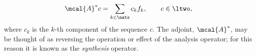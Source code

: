 \documentclass[a4paper, 12pt,preprint]{article}
\newcommand{\sumn}{\ensuremath{\sum_{k \in \nats}}\xspace}
\begin{document}
\begin{align}
  \mcal{A}^* c = \sum_{k \in \nats} c_k f_k, \qquad  c \in \ltwo,\notag
  \label{}
\end{align}
where $c_k$ is the $k$-th component of the sequence $c$. The adjoint, $\mcal{A}^*$, may be thought of as reversing the operation or effect of the analysis operator; for this reason it is known as the \emph{synthesis} operator.
\begin{comment}
By composing the analysis and the synthesis operators, we obtain the \emph{frame operator} $F:\LtwoR \to \LtwoR$ defined as: 
\begin{align}
  \mcal{F} f := \mcal{A}\mcal{A}^*f = \sum_{k \in \nats} \langle f, f_k \rangle f_k, \notag
\end{align}
for all $f \in \LtwoR$.
The frame operator $F$ is bounded, invertible, and self-adjoint\footnote{See \cite{Christensen2001} and the references therein.}. This yields the representation result
\begin{align}
  f = FF^{-1}f = \sumn \langle f, F^{-1} f_k\rangle f_k. \notag 
  \label{}
\end{align}
The sequence $\{F^{-1}f_k\}_{k \in \nats}$ is also a frame, and it is called the \emph{canonical dual} of $\{f_k\}_{k \in \nats}$. A frame will generally have other duals besides the canonical dual. That is, there exists  sequences $\{\tilde{f}_k\}_{k \in \nats}$ besides the canonical sequence such that 
\begin{align}
  f = \sumn \langle f, \tilde{f}_k\rangle f_k \qquad  f \in \LtwoR.
  \label{eq:dual}
\end{align}
\end{comment}
\end{document}
